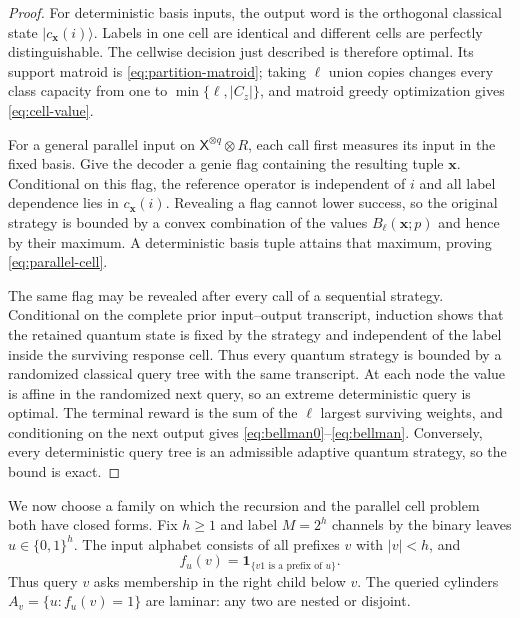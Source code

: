 \documentclass[11pt]{article}
\theoremstyle{definition}
\theoremstyle{remark}
\newcommand{\ket}[1]{\lvert #1\rangle}
\begin{document}
\begin{proof}
For deterministic basis inputs, the output word is the orthogonal classical
state $\ket{c_{\bm x}(i)}$.  Labels in one cell are identical and different
cells are perfectly distinguishable.  The cellwise decision just described
is therefore optimal.  Its support matroid is
\eqref{eq:partition-matroid}; taking $\ell$ union copies changes every class
capacity from one to $\min\{\ell,|C_z|\}$, and matroid greedy optimization
gives \eqref{eq:cell-value}.

For a general parallel input on $\mathsf X^{\otimes q}\otimes R$, each call
first measures its input in the fixed basis.  Give the decoder a genie flag
containing the resulting tuple $\bm x$.  Conditional on this flag, the
reference operator is independent of $i$ and all label dependence lies in
$c_{\bm x}(i)$.  Revealing a flag cannot lower success, so the original
strategy is bounded by a convex combination of the values
$B_\ell(\bm x;p)$ and hence by their maximum.  A deterministic basis tuple
attains that maximum, proving \eqref{eq:parallel-cell}.

The same flag may be revealed after every call of a sequential strategy.
Conditional on the complete prior input--output transcript, induction shows
that the retained quantum state is fixed by the strategy and independent of
the label inside the surviving response cell.  Thus every quantum strategy
is bounded by a randomized classical query tree with the same transcript.
At each node the value is affine in the randomized next query, so an extreme
deterministic query is optimal.  The terminal reward is the sum of the
$\ell$ largest surviving weights, and conditioning on the next output gives
\eqref{eq:bellman0}--\eqref{eq:bellman}.  Conversely, every deterministic
query tree is an admissible adaptive quantum strategy, so the bound is exact.
\end{proof}

We now choose a family on which the recursion and the parallel cell problem
both have closed forms.  Fix $h\geq1$ and label $M=2^h$ channels by the
binary leaves $u\in\{0,1\}^h$.  The input alphabet consists of all prefixes
$v$ with $|v|<h$, and
\begin{equation}\label{eq:prefix-channel}
 f_u(v)=\mathbf1_{\{v1\text{ is a prefix of }u\}}.
\end{equation}
Thus query $v$ asks membership in the right child below $v$.  The queried
cylinders $A_v=\{u:f_u(v)=1\}$ are laminar: any two are nested or disjoint.
\end{document}
